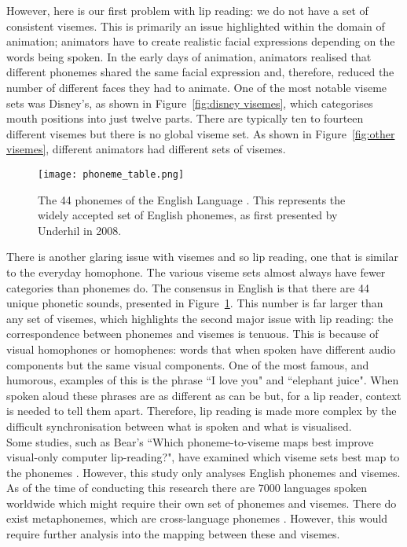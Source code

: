 However, here is our first problem with lip reading: we do not have a set of consistent \gls{viseme}s. This is primarily an issue highlighted within the domain of animation; animators have to create realistic facial expressions depending on the words being spoken. In the early days of animation, animators realised that different \gls{phoneme}s shared the same facial expression and, therefore, reduced the number of different faces they had to animate. One of the most notable \gls{viseme} sets was Disney's, as shown in Figure~\ref{fig:disney visemes}, which categorises mouth positions into just twelve parts. There are typically ten to fourteen different \gls{viseme}s but there is no global \gls{viseme} set. As shown in Figure~\ref{fig:other visemes}, different animators had different sets of \gls{viseme}s.\\
\begin{figure}
\centering
\texttt{[image: phoneme\_table.png]}
\caption[The 44 \Gls{phoneme}s of the English Language.]{The 44 \Gls{phoneme}s of the English Language \cite{44_phonemes}. This represents the widely accepted set of English \gls{phoneme}s, as first presented by Underhil in 2008.}
\label{fig:phoneme table}
\end{figure}
There is another glaring issue with \gls{viseme}s and so lip reading, one that is similar to the everyday homophone. The various \gls{viseme} sets almost always have fewer categories than \gls{phoneme}s do. The consensus in English is that there are 44 unique phonetic sounds, presented in Figure~\ref{fig:phoneme table}. This number is far larger than any set of \gls{viseme}s, which highlights the second major issue with lip reading: the correspondence between \gls{phoneme}s and \gls{viseme}s is tenuous. This is because of visual homophones or homophenes: words that when spoken have different audio components but the same visual components. One of the most famous, and humorous, examples of this is the phrase ``I love you" and ``elephant juice". When spoken aloud these phrases are as different as can be but, for a lip reader, context is needed to tell them apart. Therefore, lip reading is made more complex by the difficult synchronisation between what is spoken and what is visualised.\\
Some studies, such as Bear's ``Which \gls{phoneme}-to-\gls{viseme} maps best improve visual-only computer lip-reading?", have examined which \gls{viseme} sets best map to the \gls{phoneme}s \cite{phoneme_viseme_mapping_review}. However, this study only analyses English \gls{phoneme}s and \gls{viseme}s. As of the time of conducting this research there are 7000 languages spoken worldwide \cite{7000_languages_globally} which might require their own set of \gls{phoneme}s and \gls{viseme}s. There do exist metaphonemes, which are cross-language \gls{phoneme}s \cite{Cross-Linguistic-Phoneme-Correspondences}. However, this would require further analysis into the mapping between these and \gls{viseme}s.\\
